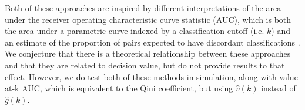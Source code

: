Both of these approaches are inspired by different interpretations of the area under the receiver operating characteristic curve statistic (AUC), which is both the area under a parametric curve indexed by a classification cutoff (i.e. $k$) and an estimate of the proportion of pairs expected to have discordant classifications \cite{Hanley:1982cz}. We conjecture that there is a theoretical relationship between these approaches and that they are related to decision value, but do not provide results to that effect. However, we do test both of these methods in simulation, along with value-at-k AUC, which is equivalent to the Qini coefficient, but using $\hat{v}(k)$ instead of $\hat{g}(k)$.


\begin{comment}

Recall that the decision policy can be parametrized with a cutoff $k$: $\hat d(x,k) = I(\hat\tau>k)$. We can therefore also calculate the gain at $k$, $\hat g(k)$, which is the gain obtained when individuals with an estimated treatment effect greater than $k$ are treated. Researchers in direct marketing often rely on \emph{uplift curves} (also called gain curves or cumulative gain charts) \ to aid in model selection. The uplift curve plots gain at $k$:

\[
	\hat g(k)  =  \sum_{\mathcal{V}} \dfrac{y_i  \hat d(x_i,k) (2w_i-1)}{p_{w_i}(x_i)} 
\]




Researchers either evaluate these curves heuristically, take the maximum value over $k$, or calculate the \emph{Qini coefficient}, which is the area under the uplift curve \cite{Gutierrez:2016tq}. Given the relationship between gain and value, maximizing these metrics is equivalent to maximizing the equivalent value-based metric. 

\subsubsection{The concordance-for-benefit statistic}

\citet{vanKlaveren:2018gg} propose the concordance-for-benefit statistic to select among treatment effect models. Briefly, each individual $i$ in the test set is matched without replacement according to estimated treatment effect with another individual in the test set $\bar{i}$ ($\hat\tau(x_i) \approx \hat\tau(x_{\bar i})$) with the opposite treatment $w_i \ne w_{\bar i}$. The total number of pairs is $J$. For each pair of matched patients $j$, the difference in outcomes between the treated and untreated individuals is recorded: $\delta_j = (2w_i - 1)(y_i -y_{\bar i})$, along with the predicted treatment effect for both patients $t_j = \hat\tau(x_i)$. The concordance-for-benefit (or c-for-benefit) statistic is


\end{comment}
